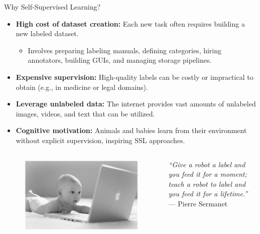 \begin{frame}[allowframebreaks]{Why Self-Supervised Learning?}
    \begin{itemize}
        \item \textbf{High cost of dataset creation:} Each new task often requires building a new labeled dataset.
        \begin{itemize}
            \item Involves preparing labeling manuals, defining categories, hiring annotators, building GUIs, and managing storage pipelines.
        \end{itemize}
        \item \textbf{Expensive supervision:} High-quality labels can be costly or impractical to obtain (e.g., in medicine or legal domains).
        \item \textbf{Leverage unlabeled data:} The internet provides vast amounts of unlabeled images, videos, and text that can be utilized.
        \item \textbf{Cognitive motivation:} Animals and babies learn from their environment without explicit supervision, inspiring SSL approaches.
    \end{itemize}

    \framebreak

    \begin{columns}
    \begin{column}{0.7\textwidth}
        \begin{figure}
            \flushleft
            \includegraphics[width=\linewidth,height=0.8\textheight,keepaspectratio]{images/ssl/slide_7_1_img.png}
        \end{figure}
    \end{column}
    \begin{column}{0.4\textwidth}
        \textit{“Give a robot a label and you feed it for a moment; teach a robot to label and you feed it for a lifetime.”} \\
        \hspace*{\fill}--- Pierre Sermanet


\end{column}
\end{columns}
\end{frame}

